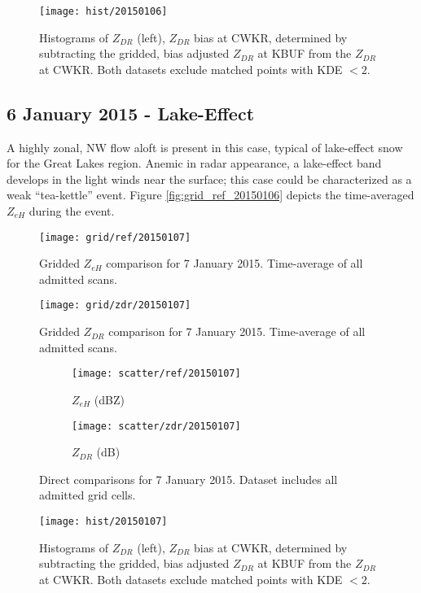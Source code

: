 \begin{figure}[p]
\texttt{[image: hist/20150106]}\centering
\caption{Histograms of $Z_{DR}$ (left), $Z_{DR}$ bias at CWKR, determined by subtracting the gridded, bias adjusted $Z_{DR}$ at KBUF from the $Z_{DR}$ at CWKR. Both datasets exclude matched points with KDE $< 2$. } 
\label{fig:hist_20150106}
\end{figure}

\subsection{6 January 2015 - Lake-Effect}
A highly zonal, NW flow aloft is present in this case, typical of lake-effect snow for the Great Lakes region. Anemic in radar appearance, a lake-effect band develops in the light winds near the surface; this case could be characterized as a weak ``tea-kettle'' event. Figure \ref{fig:grid_ref_20150106} depicts the time-averaged $Z_{eH}$ during the event.
\begin{figure}[p]
\texttt{[image: grid/ref/20150107]}
\caption{Gridded $Z_{eH}$ comparison for 7 January 2015. Time-average of all admitted scans.} 
\label{fig:grid_ref_20150107}
\end{figure}

\begin{figure}[p]
\texttt{[image: grid/zdr/20150107]}
\caption{Gridded $Z_{DR}$ comparison for 7 January 2015. Time-average of all admitted scans.} 
\label{fig:grid_zdr_20150107}
\end{figure}

\begin{figure}[p]
\centering
   \begin{subfigure}{0.49\linewidth} \centering
     \texttt{[image: scatter/ref/20150107]}
     \caption{$Z_{eH}$ (dBZ)}\label{fig:scatter_ref_20150107}
   \end{subfigure}
   \begin{subfigure}{0.49\linewidth} \centering
     \texttt{[image: scatter/zdr/20150107]}
     \caption{$Z_{DR}$ (dB)}\label{fig:scatter_zdr_20150107}
   \end{subfigure}
\caption{Direct comparisons for 7 January 2015. Dataset includes all admitted grid cells.} \label{fig:scatter_20150107}
\end{figure}

\begin{figure}[p]
\texttt{[image: hist/20150107]}\centering
\caption{Histograms of $Z_{DR}$ (left), $Z_{DR}$ bias at CWKR, determined by subtracting the gridded, bias adjusted $Z_{DR}$ at KBUF from the $Z_{DR}$ at CWKR. Both datasets exclude matched points with KDE $< 2$. } 
\label{fig:hist_20150107}
\end{figure}

